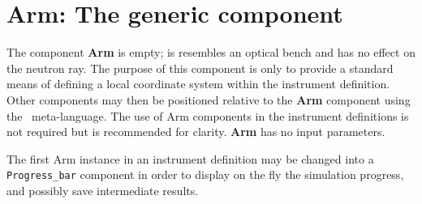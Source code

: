 \section{Arm: The generic component}
\label{explain:arm}

The component {\bf Arm} is empty; is resembles an optical bench
and has no effect on the neutron ray.
The purpose of this component is only to provide a standard
means of defining a local coordinate system within the instrument definition.
Other components may then be
positioned relative to the {\bf Arm} component
using the \MCS\ meta-language.
The use of {\rm Arm} components in the instrument definitions
is not required but is recommended for clarity.
{\bf Arm} has no input parameters.

The first Arm instance in an instrument definition may be changed into a \verb+Progress_bar+ component in order to display on the fly the simulation progress, and possibly save intermediate results.
